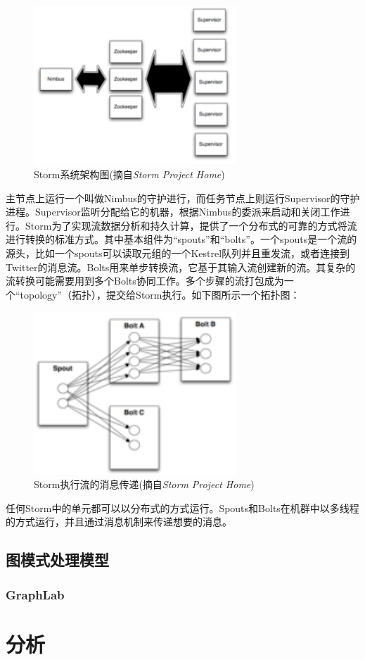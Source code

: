 \begin{figure}[]
\centering
\includegraphics[width=3in]{../figures/storma.pdf}
\caption{Storm系统架构图(摘自\textit{Storm Project Home})}
\label{fig:storma}
\end{figure}

主节点上运行一个叫做Nimbus的守护进行，而任务节点上则运行Supervisor的守护进程。Supervisor监听分配给它的机器，根据Nimbus的委派来启动和关闭工作进行。Storm为了实现流数据分析和持久计算，提供了一个分布式的可靠的方式将流进行转换的标准方式。其中基本组件为“spouts”和“bolts”。一个spouts是一个流的源头，比如一个spouts可以读取元组的一个Kestrel队列并且重发流，或者连接到Twitter的消息流。Bolts用来单步转换流，它基于其输入流创建新的流。其复杂的流转换可能需要用到多个Bolts协同工作。多个步骤的流打包成为一个“topology”（拓扑），提交给Storm执行。如下图所示一个拓扑图：

\begin{figure}[]
\centering
\includegraphics[width=3in]{../figures/stormb.pdf}
\caption{Storm执行流的消息传递(摘自\textit{Storm Project Home})}
\label{fig:stormb}
\end{figure}

任何Storm中的单元都可以以分布式的方式运行。Spouts和Bolts在机群中以多线程的方式运行，并且通过消息机制来传递想要的消息。

\subsection{图模式处理模型}
\subsubsection{GraphLab}

\section{分析}
